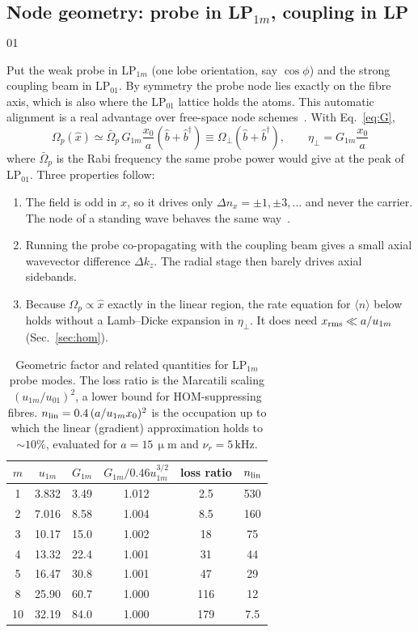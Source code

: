 \documentclass[11pt,a4paper]{article}
\newcommand{\micrometre}{\upmu m}\newcommand{\microkelvin}{\upmu K}
\newcommand{\SI}[2]{\ensuremath{#1\,\mathrm{#2}}}
\newcommand{\Om}{\Omega}
\newcommand{\etaeff}{\eta_{\perp}}
\begin{document}
\subsection{Node geometry: probe in LP$_{1m}$, coupling in LP$_{01}$}
Put the weak probe in LP$_{1m}$ (one lobe orientation, say $\cos\phi$) and the strong coupling beam in LP$_{01}$. By symmetry the probe node lies exactly on the fibre axis, which is also where the LP$_{01}$ lattice holds the atoms. This automatic alignment is a real advantage over free-space node schemes~\cite{cirac1992}. With Eq.~\eqref{eq:G},
\begin{equation}
  \Om_p(\hat x)\simeq \bar\Om_p\,G_{1m}\frac{x_0}{a}(\hat b+\hat b^\dagger)
  \equiv\Om_\perp(\hat b+\hat b^\dagger),\qquad
  \boxed{\etaeff=G_{1m}\frac{x_0}{a}}
  \label{eq:etaeff}
\end{equation}
where $\bar\Om_p$ is the Rabi frequency the same probe power would give at the peak of LP$_{01}$. Three properties follow:
\begin{enumerate}
\item The field is odd in $x$, so it drives only $\Delta n_x=\pm1,\pm3,\dots$ and never the carrier. The node of a standing wave behaves the same way~\cite{cirac1992}.
\item Running the probe co-propagating with the coupling beam gives a small axial wavevector difference $\Delta k_z$. The radial stage then barely drives axial sidebands.
\item Because $\Om_p\propto\hat x$ exactly in the linear region, the rate equation for $\langle n\rangle$ below holds without a Lamb--Dicke expansion in $\etaeff$. It does need $x_{\rm rms}\ll a/u_{1m}$ (Sec.~\ref{sec:hom}).
\end{enumerate}

\begin{table}[t]
\centering
\caption{Geometric factor and related quantities for LP$_{1m}$ probe modes. The loss ratio is the Marcatili scaling $(u_{1m}/u_{01})^2$, a lower bound for HOM-suppressing fibres. $n_{\rm lin}=0.4\,(a/u_{1m}x_0)^2$ is the occupation up to which the linear (gradient) approximation holds to $\sim10\%$, evaluated for $a=\SI{15}{\micrometre}$ and $\nu_r=\SI{5}{kHz}$.}
\label{tab:G}
\begin{tabular}{cccccc}
\toprule
$m$ & $u_{1m}$ & $G_{1m}$ & $G_{1m}/0.46u_{1m}^{3/2}$ & loss ratio & $n_{\rm lin}$\\
\midrule
1 & 3.832 & 3.49 & 1.012 & 2.5 & 530\\
2 & 7.016 & 8.58 & 1.004 & 8.5 & 160\\
3 & 10.17 & 15.0 & 1.002 & 18 & 75\\
4 & 13.32 & 22.4 & 1.001 & 31 & 44\\
5 & 16.47 & 30.8 & 1.001 & 47 & 29\\
8 & 25.90 & 60.7 & 1.000 & 116 & 12\\
10 & 32.19 & 84.0 & 1.000 & 179 & 7.5\\
\bottomrule
\end{tabular}
\end{table}
\end{document}
